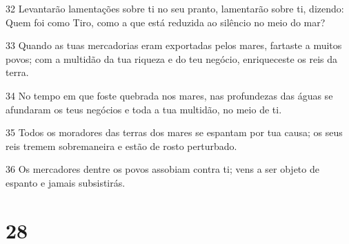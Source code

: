 \par 32 Levantarão lamentações sobre ti no seu pranto, lamentarão sobre ti, dizendo: Quem foi como Tiro, como a que está reduzida ao silêncio no meio do mar?
\par 33 Quando as tuas mercadorias eram exportadas pelos mares, fartaste a muitos povos; com a multidão da tua riqueza e do teu negócio, enriqueceste os reis da terra.
\par 34 No tempo em que foste quebrada nos mares, nas profundezas das águas se afundaram os teus negócios e toda a tua multidão, no meio de ti.
\par 35 Todos os moradores das terras dos mares se espantam por tua causa; os seus reis tremem sobremaneira e estão de rosto perturbado.
\par 36 Os mercadores dentre os povos assobiam contra ti; vens a ser objeto de espanto e jamais subsistirás.

\chapter{28}

